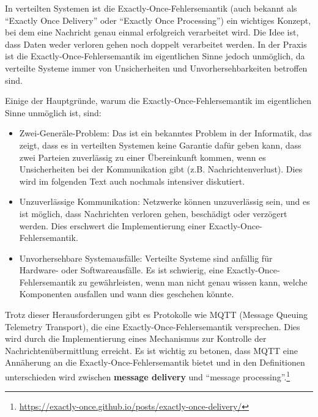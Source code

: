 In verteilten Systemen ist die Exactly-Once-Fehlersemantik (auch bekannt als \enquote{Exactly Once Delivery} oder \enquote{Exactly Once Processing}) ein wichtiges Konzept, bei dem eine Nachricht genau einmal erfolgreich verarbeitet wird. Die Idee ist, dass Daten weder verloren gehen noch doppelt verarbeitet werden. In der Praxis ist die Exactly-Once-Fehlersemantik im eigentlichen Sinne jedoch unmöglich, da verteilte Systeme immer von Unsicherheiten und Unvorhersehbarkeiten betroffen sind.

Einige der Hauptgründe, warum die Exactly-Once-Fehlersemantik im eigentlichen Sinne unmöglich ist, sind:
\begin{itemize}
\item Zwei-Generäle-Problem: Das ist ein bekanntes Problem in der Informatik, das zeigt, dass es in verteilten Systemen keine Garantie dafür geben kann, dass zwei Parteien zuverlässig zu einer Übereinkunft kommen, wenn es Unsicherheiten bei der Kommunikation gibt (z.B. Nachrichtenverlust). Dies wird im folgenden Text auch nochmals intensiver diskutiert.
\item Unzuverlässige Kommunikation: Netzwerke können unzuverlässig sein, und es ist möglich, dass Nachrichten verloren gehen, beschädigt oder verzögert werden. Dies erschwert die Implementierung einer Exactly-Once-Fehlersemantik.
\item Unvorhersehbare Systemausfälle: Verteilte Systeme sind anfällig für Hardware- oder Softwareausfälle. Es ist schwierig, eine Exactly-Once-Fehlersemantik zu gewährleisten, wenn man nicht genau wissen kann, welche Komponenten ausfallen und wann dies geschehen könnte.
\end{itemize}
Trotz dieser Herausforderungen gibt es Protokolle wie MQTT (Message Queuing Telemetry Transport), die eine Exactly-Once-Fehlersemantik versprechen. Dies wird durch die Implementierung eines Mechanismus zur Kontrolle der Nachrichtenübermittlung erreicht. Es ist wichtig zu betonen, dass MQTT eine Annäherung an die Exactly-Once-Fehlersemantik bietet und in den Definitionen unterschieden wird zwischen  \textbf{message delivery} und \enquote{message processing}.\footnote{\url{https://exactly-once.github.io/posts/exactly-once-delivery/}}

